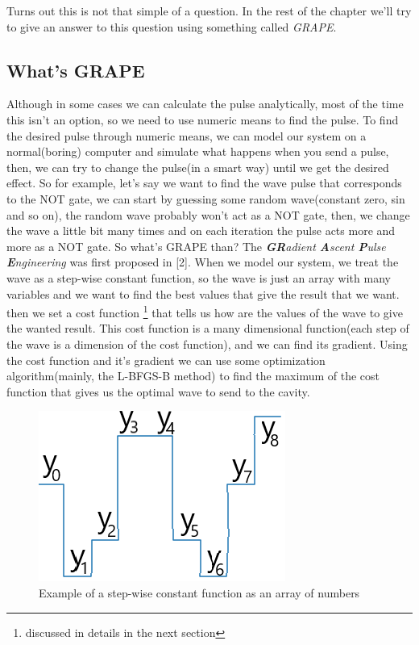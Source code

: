 \documentclass[english, a4paper, 12pt, twoside]{article}
\numberwithin{equation}{section} %
\begin{document}
Turns out this is not that simple of a question. In the rest of the chapter we'll try to give an answer to this question using something called \textit{GRAPE}.

\subsection{What's GRAPE}
Although in some cases we can calculate the pulse analytically, most of the time this isn't an option, so we need to use numeric means to find the pulse. To find the desired pulse through numeric means, we can model our system on a normal(boring) computer and simulate what happens when you send a pulse, then, we can try to change the pulse(in a smart way) until we get the desired effect. So for example, let's say we want to find the wave pulse that corresponds to the NOT gate, we can start by guessing some random wave(constant zero, sin and so on), the random wave probably won't act as a NOT gate, then, we change the wave a little bit many times and on each iteration the pulse acts more and more as a NOT gate.
So what's GRAPE than? The \textit{\textbf{GR}adient \textbf{A}scent \textbf{P}ulse \textbf{E}ngineering} was first proposed in [2]. When we model our system, we treat the wave as a step-wise constant function, so the wave is just an array with many variables and we want to find the best values that give the result that we want. then we set a cost function \footnote{discussed in details in the next section} that tells us how are the values of the wave to give the wanted result. This cost function is a many dimensional function(each step of the wave is a dimension of the cost function), and we can find its gradient. Using the cost function and it's gradient we can use some optimization algorithm(mainly, the L-BFGS-B method) to find the maximum of the cost function that gives us the optimal wave to send to the cavity.

\begin{figure}[H]
    \centering
    \includegraphics[width=0.3\columnwidth]{step-wise_example.png} %
    \caption{Example of a step-wise constant function as an array of numbers}
    \label{fig:step-wise-const}
\end{figure}
\end{document}
